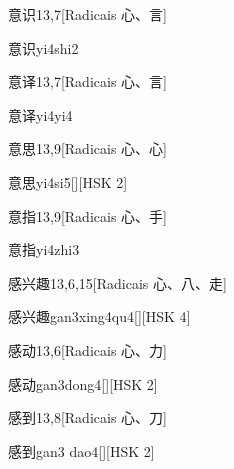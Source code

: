 \begin{entry}{意识}{13,7}[Radicais ⼼、⾔]
  \begin{phonetics}{意识}{yi4shi2}
  \end{phonetics}
\end{entry}

\begin{entry}{意译}{13,7}[Radicais ⼼、⾔]
  \begin{phonetics}{意译}{yi4yi4}
  \end{phonetics}
\end{entry}

\begin{entry}{意思}{13,9}[Radicais ⼼、⼼]
  \begin{phonetics}{意思}{yi4si5}[][HSK 2]
  \end{phonetics}
\end{entry}

\begin{entry}{意指}{13,9}[Radicais ⼼、⼿]
  \begin{phonetics}{意指}{yi4zhi3}
  \end{phonetics}
\end{entry}

\begin{entry}{感兴趣}{13,6,15}[Radicais ⼼、⼋、⾛]
  \begin{phonetics}{感兴趣}{gan3xing4qu4}[][HSK 4]
  \end{phonetics}
\end{entry}

\begin{entry}{感动}{13,6}[Radicais ⼼、⼒]
  \begin{phonetics}{感动}{gan3dong4}[][HSK 2]
  \end{phonetics}
\end{entry}

\begin{entry}{感到}{13,8}[Radicais ⼼、⼑]
  \begin{phonetics}{感到}{gan3 dao4}[][HSK 2]
  \end{phonetics}
\end{entry}

